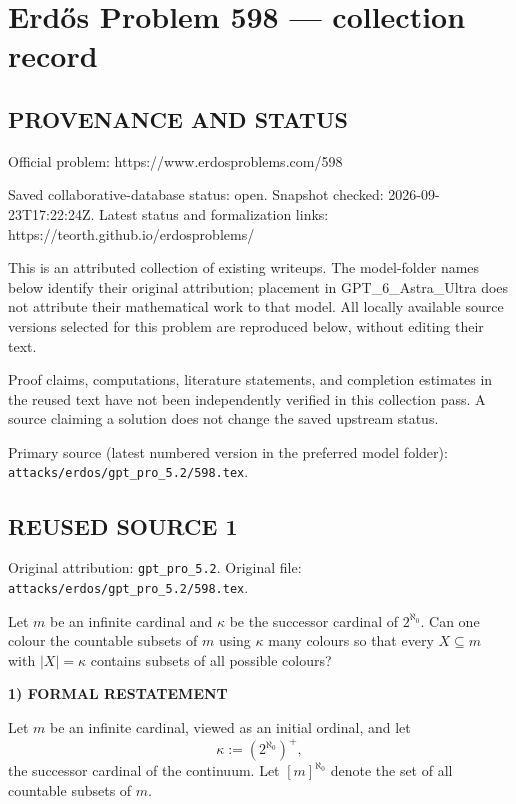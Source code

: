 \section*{Erd\H{o}s Problem 598 --- collection record}

\subsection*{PROVENANCE AND STATUS}
Official problem: https://www.erdosproblems.com/598

Saved collaborative-database status: open.
Snapshot checked: 2026-09-23T17:22:24Z.
Latest status and formalization links: https://teorth.github.io/erdosproblems/

This is an attributed collection of existing writeups. The model-folder names below identify their original attribution; placement in GPT\_6\_Astra\_Ultra does not attribute their mathematical work to that model. All locally available source versions selected for this problem are reproduced below, without editing their text.

Proof claims, computations, literature statements, and completion estimates in the reused text have not been independently verified in this collection pass. A source claiming a solution does not change the saved upstream status.

Primary source (latest numbered version in the preferred model folder): \texttt{attacks/erdos/gpt\_pro\_5.2/598.tex}.

\subsection*{REUSED SOURCE 1}
Original attribution: \texttt{gpt\_pro\_5.2}.
Original file: \texttt{attacks/erdos/gpt\_pro\_5.2/598.tex}.


Let $m$ be an infinite cardinal and $\kappa$ be the successor cardinal of $2^{\aleph_0}$. Can one colour the countable subsets of $m$ using $\kappa$ many colours so that every $X\subseteq m$ with $\lvert X\rvert=\kappa$ contains subsets of all possible colours?

\noindent\textbf{1) FORMAL RESTATEMENT}\par
Let $m$ be an infinite cardinal, viewed as an initial ordinal, and let
\[
\kappa := (2^{\aleph_0})^+,
\]
the successor cardinal of the continuum.
Let $[m]^{\aleph_0}$ denote the set of all countable subsets of $m$.

